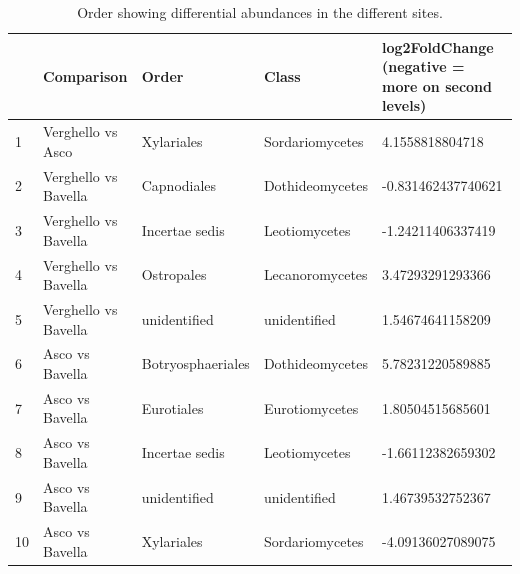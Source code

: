 \documentclass[12pt]{article}\usepackage[]{graphicx}\usepackage[]{color}
\numberwithin{figure}{section}
\begin{document}
\begin{table}[ht]
\centering
\begingroup\tiny
\begin{tabular}{lllll}
  \hline
 & Comparison & Order & Class & log2FoldChange 
 (negative = more on second levels) \\ 
  \hline
1 & Verghello vs Asco & Xylariales & Sordariomycetes & 4.1558818804718 \\ 
  2 & Verghello vs Bavella & Capnodiales & Dothideomycetes & -0.831462437740621 \\ 
  3 & Verghello vs Bavella & Incertae sedis & Leotiomycetes & -1.24211406337419 \\ 
  4 & Verghello vs Bavella & Ostropales & Lecanoromycetes & 3.47293291293366 \\ 
  5 & Verghello vs Bavella & unidentified & unidentified & 1.54674641158209 \\ 
  6 & Asco vs Bavella & Botryosphaeriales & Dothideomycetes & 5.78231220589885 \\ 
  7 & Asco vs Bavella & Eurotiales & Eurotiomycetes & 1.80504515685601 \\ 
  8 & Asco vs Bavella & Incertae sedis & Leotiomycetes & -1.66112382659302 \\ 
  9 & Asco vs Bavella & unidentified & unidentified & 1.46739532752367 \\ 
  10 & Asco vs Bavella & Xylariales & Sordariomycetes & -4.09136027089075 \\ 
   \hline
\end{tabular}
\endgroup
\caption{Order showing differential abundances in the different sites.} 
\end{table}


\cleardoublepage
\listoffigures
\listoftables
\end{document}
